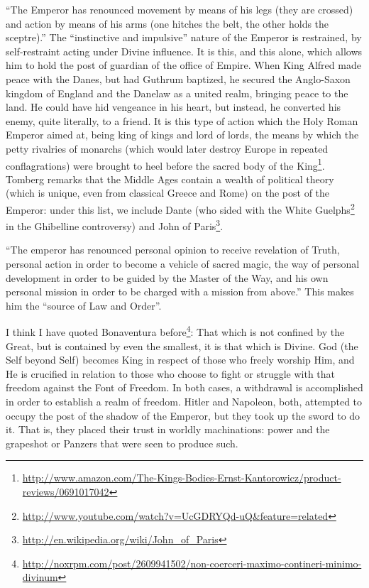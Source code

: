 ``The Emperor has renounced movement by means of his legs (they are crossed) and action by means of his arms (one hitches the belt, the other holds the sceptre).'' The ``instinctive and impulsive'' nature of the Emperor is restrained, by self-restraint acting under Divine influence. It is this, and this alone, which allows him to hold the post of guardian of the office of Empire. When King Alfred made peace with the Danes, but had Guthrum baptized, he secured the Anglo-Saxon kingdom of England and the Danelaw as a united realm, bringing peace to the land. He could have hid vengeance in his heart, but instead, he converted his enemy, quite literally, to a friend. It is this type of action which the Holy Roman Emperor aimed at, being king of kings and lord of lords, the means by which the petty rivalries of monarchs (which would later destroy Europe in repeated conflagrations) were brought to heel before the sacred body of the King\footnote{\url{http://www.amazon.com/The-Kings-Bodies-Ernst-Kantorowicz/product-reviews/0691017042}}. Tomberg remarks that the Middle Ages contain a wealth of political theory (which is unique, even from classical Greece and Rome) on the post of the Emperor: under this list, we include Dante (who sided with the White Guelphs\footnote{\url{http://www.youtube.com/watch?v=UcGDRYQd-uQ&feature=related}} in the Ghibelline controversy) and John of Paris\footnote{\url{http://en.wikipedia.org/wiki/John_of_Paris}}.

``The emperor has renounced personal opinion to receive revelation of Truth, personal action in order to become a vehicle of sacred magic, the way of personal development in order to be guided by the Master of the Way, and his own personal mission in order to be charged with a mission from above.'' This makes him the ``source of Law and Order''.

I think I have quoted Bonaventura before\footnote{\url{http://noxrpm.com/post/2609941502/non-coerceri-maximo-contineri-minimo-divinum}}: That which is not confined by the Great, but is contained by even the smallest, it is that which is Divine. God (the Self beyond Self) becomes King in respect of those who freely worship Him, and He is crucified in relation to those who choose to fight or struggle with that freedom against the Font of Freedom. In both cases, a withdrawal is accomplished in order to establish a realm of freedom. Hitler and Napoleon, both, attempted to occupy the post of the shadow of the Emperor, but they took up the sword to do it. That is, they placed their trust in worldly machinations: power and the grapeshot or Panzers that were seen to produce such.

